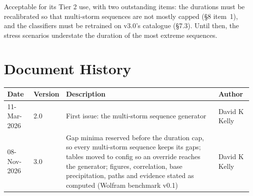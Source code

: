\documentclass[11pt,a4paper]{article}
\renewcommand{\mkmhistorypage}[1]{%
    \section{Document History}
    \begin{table}[ht]
        \centering
        \begin{tabular}{l|l|p{9cm}|l}
            \textbf{Date} & \textbf{Version} & \textbf{Description} & \textbf{Author} \\
            \hline
            #1
        \end{tabular}
    \end{table}
}
\begin{document}
Acceptable for its Tier 2 use, with two outstanding items: the durations must be
recalibrated so that multi-storm sequences are not mostly capped (\S8 item~1), and the
classifiers must be retrained on v3.0's catalogue (\S7.3). Until then, the stress
scenarios understate the duration of the most extreme sequences.

\mkmhistorypage{11-Mar-2026 & 2.0 & First issue: the multi-storm sequence generator & David K Kelly \\
08-Nov-2026 & 3.0 & Gap minima reserved before the duration cap, so every multi-storm
sequence keeps its gaps; tables moved to config so an override reaches the generator;
figures, correlation, base precipitation, paths and evidence stated as computed (Wolfram
benchmark v0.1) & David K Kelly \\}
\end{document}
